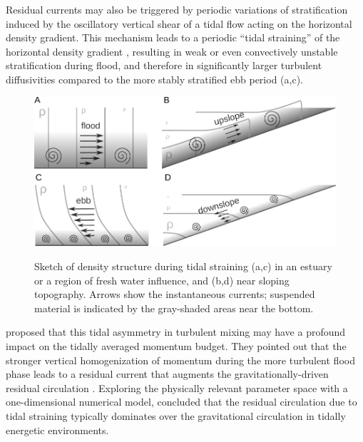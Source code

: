 Residual currents may also be triggered by periodic variations of
stratification induced by the oscillatory vertical shear of a tidal
flow acting on the horizontal density gradient. This mechanism leads
to a periodic ``tidal straining'' of the horizontal density gradient
\citep{Simpsonetal90a}, resulting in weak or even convectively
unstable stratification during flood, and therefore in significantly
larger turbulent diffusivities compared to the more stably stratified
ebb period (a,c). 
\begin{figure}[h]
  \noindent\includegraphics[width=30pc,angle=0]{bilder/geometryvergleich.pdf}\\
  \caption{Sketch of density structure during tidal straining (a,c) in
    an estuary or a region of fresh water influence, and (b,d) near
    sloping topography. Arrows show the instantaneous currents;
    suspended material is indicated by the gray-shaded areas near the
    bottom.}\label{straining}
\end{figure}

\cite{JayMusiak94a} proposed that
this tidal asymmetry in turbulent mixing may have a profound impact on
the tidally averaged momentum budget. They pointed out that the
stronger vertical homogenization of momentum during the more turbulent
flood phase leads to a residual current that augments the
gravitationally-driven residual circulation
\citep[see][]{MacCreadyGeyer2010}. Exploring the physically relevant
parameter space with a one-dimensional numerical model,
\cite{BurchardHetland2010a} concluded that the residual circulation
due to tidal straining typically dominates over the gravitational
circulation in tidally energetic environments.

